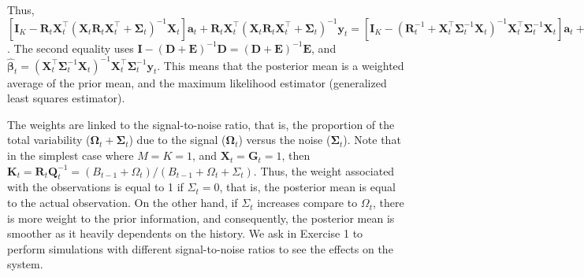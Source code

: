 Thus, $[\bm{I}_K-\bm{R}_{t}\bm{X}_t^{\top}(\bm{X}_t\bm{R}_{t}\bm{X}_t^{\top}+ \bm{\Sigma}_t)^{-1}\bm{X}_t]\bm{a}_{t}+\bm{R}_{t}\bm{X}_t^{\top}(\bm{X}_t\bm{R}_{t}\bm{X}_t^{\top}+ \bm{\Sigma}_t)^{-1}\bm{y}_t=[\bm{I}_K-(\bm{R}_t^{-1}+\bm{X}_t^{\top}\bm{\Sigma}_t^{-1}\bm{X}_t)^{-1}\bm{X}_t^{\top}\bm{\Sigma}_t^{-1}\bm{X}_t]\bm{a}_{t}+(\bm{R}_t^{-1}+\bm{X}_t^{\top}\bm{\Sigma}_t^{-1}\bm{X}_t)^{-1}\bm{X}_t^{\top}\bm{\Sigma}_t^{-1}\bm{y}_t=(\bm{R}_t^{-1}+\bm{X}_t^{\top}\bm{\Sigma}_t^{-1}\bm{X}_t)^{-1}\bm{R}_t^{-1}\bm{a}_{t}+(\bm{R}_t^{-1}+\bm{X}_t^{\top}\bm{\Sigma}_t^{-1}\bm{X}_t)^{-1}\bm{X}_t^{\top}\bm{\Sigma}_t^{-1}\bm{y}_t=(\bm{R}_t^{-1}+\bm{X}_t^{\top}\bm{\Sigma}_t^{-1}\bm{X}_t)^{-1}(\bm{R}_t^{-1}\bm{a}_{t}+\bm{X}_t^{\top}\bm{\Sigma}_t^{-1}\bm{y}_t)=(\bm{R}_t^{-1}+\bm{X}_t^{\top}\bm{\Sigma}_t^{-1}\bm{X}_t)^{-1}(\bm{R}_t^{-1}\bm{a}_{t}+\bm{X}_t^{\top}\bm{\Sigma}_t^{-1}\bm{X}_t\hat{\bm{\beta}}_t)$. The second equality uses $\bm{I}-(\bm{D}+\bm{E})^{-1}\bm{D}=(\bm{D}+\bm{E})^{-1}\bm{E}$, and $\hat{\bm{\beta}}_t=(\bm{X}_t^{\top}\bm{\Sigma}_t^{-1}\bm{X}_t)^{-1}\bm{X}_t^{\top}\bm{\Sigma}_t^{-1}\bm{y}_t$. This means that the posterior mean is a weighted average of the prior mean, and the maximum likelihood estimator (generalized least squares estimator).

The weights are linked to the signal-to-noise ratio, that is, the proportion of the total variability ($\bm{\Omega}_t+\bm{\Sigma}_t$) due to the signal ($\bm{\Omega}_t$) versus the noise ($\bm{\Sigma}_t$). Note that in the simplest case where $M=K=1$, and $\bm{X}_t=\bm{G}_t=1$, then $\bm{K}_t=\bm{R}_t\bm{Q}_t^{-1}=(B_{t-1}+\Omega_t)/(B_{t-1}+\Omega_t+\Sigma_t)$. Thus, the weight associated with the observations is equal to 1 if $\Sigma_t=0$, that is, the posterior mean is equal to the actual observation. On the other hand, if $\Sigma_t$ increases compare to $\Omega_t$, there is more weight to the prior information, and consequently, the posterior mean is smoother as it heavily dependents on the history. We ask in Exercise 1 to perform simulations with different signal-to-noise ratios to see the effects on the system.   

